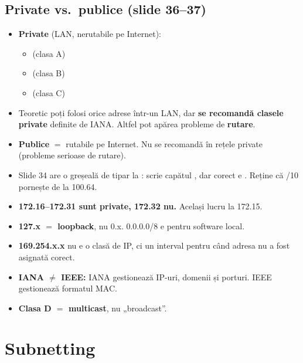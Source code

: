 \documentclass[11pt,a4paper]{article}
\begin{document}
\subsection*{Private vs.\ publice (slide 36--37)}
\begin{itemize}
  \item \textbf{Private} (LAN, nerutabile pe Internet):
  \begin{itemize}
    \item {} (clasa A)
    \item {} (clasa B)
    \item {} (clasa C)
  \end{itemize}
  \item Teoretic poți folosi orice adrese într-un LAN, dar \textbf{se recomandă clasele private} definite de IANA. Altfel pot apărea probleme de \textbf{rutare}.
  \item \textbf{Publice} $=$ rutabile pe Internet. Nu se recomandă în rețele private (probleme serioase de rutare).
\end{itemize}

\begin{capcana}
\begin{itemize}
  \item Slide 34 are o greșeală de tipar la : scrie capătul , dar corect e . Reține că /10 pornește de la 100.64.
  \item \textbf{172.16--172.31 sunt private, 172.32 nu.} Același lucru la 172.15.
  \item \textbf{127.x $=$ loopback}, nu 0.x. 0.0.0.0/8 e pentru software local.
  \item \textbf{169.254.x.x} nu e o clasă de IP, ci un interval pentru când adresa nu a fost asignată corect.
  \item \textbf{IANA $\neq$ IEEE:} IANA gestionează IP-uri, domenii și porturi. IEEE gestionează formatul MAC.
  \item \textbf{Clasa D $=$ multicast}, nu „broadcast”.
\end{itemize}
\end{capcana}

\section{Subnetting}
\end{document}
